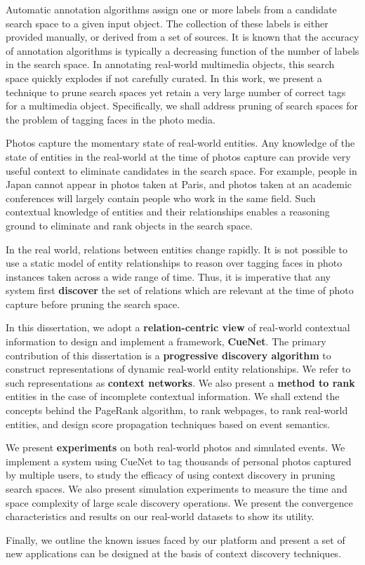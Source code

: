 \thesisabstract
{
Automatic annotation algorithms assign one or more labels from a candidate search space to a given input object. The collection of these labels is either provided manually, or derived from a set of sources. It is known that the accuracy of annotation algorithms is typically a decreasing function of the number of labels in the search space. In annotating real-world multimedia objects, this search space quickly explodes if not carefully curated. In this work, we present a technique to prune search spaces yet retain a very large number of correct tags for a multimedia object. Specifically, we shall address pruning of search spaces for the problem of tagging faces in the photo media.

Photos capture the momentary state of real-world entities. Any knowledge of the state of entities in the real-world at the time of photos capture can provide very useful context to eliminate candidates in the search space. For example, people in Japan cannot appear in photos taken at Paris, and photos taken at an academic conferences will largely contain people who work in the same field. Such contextual knowledge of entities and their relationships enables a reasoning ground to eliminate and rank objects in the search space.

In the real world, relations between entities change rapidly. It is not possible to use a static model of entity relationships to reason over tagging faces in photo instances taken across a wide range of time. Thus, it is imperative that any system first \textbf{discover} the set of relations which are relevant at the time of photo capture before pruning the search space. 

In this dissertation, we adopt a \textbf{relation-centric view} of real-world contextual information to design and implement a framework, \textbf{CueNet}. The primary contribution of this dissertation is a \textbf{progressive discovery algorithm} to construct representations of dynamic real-world entity relationships. We refer to such representations as \textbf{context networks}. We also present a \textbf{method to rank} entities in the case of incomplete contextual information. We shall extend the concepts behind the PageRank algorithm, to rank webpages, to rank real-world entities, and design score propagation techniques based on event semantics. 

We present \textbf{experiments} on both real-world photos and simulated events. We implement a system using CueNet to tag thousands of personal photos captured by multiple users, to study the efficacy of using context discovery in pruning search spaces. We also present simulation experiments to measure the time and space complexity of large scale discovery operations. We present the convergence characteristics and results on our real-world datasets to show its utility. 

Finally, we outline the known issues faced by our platform and present a set of new applications can be designed at the basis of context discovery techniques.
}


